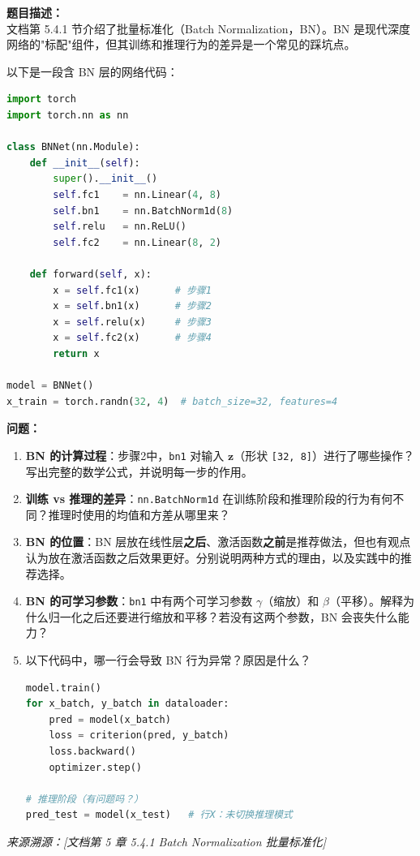 \documentclass[a4paper,11pt]{ctexart}
\begin{document}
\begin{problembox}
    \textbf{题目描述：}\\
    文档第 5.4.1 节介绍了批量标准化（Batch Normalization，BN）。BN 是现代深度网络的"标配"组件，但其训练和推理行为的差异是一个常见的踩坑点。

    \vspace{0.3cm}
    以下是一段含 BN 层的网络代码：
    \begin{lstlisting}[language=Python]
import torch
import torch.nn as nn

class BNNet(nn.Module):
    def __init__(self):
        super().__init__()
        self.fc1    = nn.Linear(4, 8)
        self.bn1    = nn.BatchNorm1d(8)
        self.relu   = nn.ReLU()
        self.fc2    = nn.Linear(8, 2)

    def forward(self, x):
        x = self.fc1(x)      # 步骤1
        x = self.bn1(x)      # 步骤2
        x = self.relu(x)     # 步骤3
        x = self.fc2(x)      # 步骤4
        return x

model = BNNet()
x_train = torch.randn(32, 4)  # batch_size=32, features=4
    \end{lstlisting}

    \textbf{问题：}
    \begin{enumerate}[(1)]
        \item \textbf{BN 的计算过程}：步骤2中，\texttt{bn1} 对输入 $\mathbf{z}$（形状 \texttt{[32, 8]}）进行了哪些操作？写出完整的数学公式，并说明每一步的作用。

        \item \textbf{训练 vs 推理的差异}：\texttt{nn.BatchNorm1d} 在训练阶段和推理阶段的行为有何不同？推理时使用的均值和方差从哪里来？

        \item \textbf{BN 的位置}：BN 层放在线性层\textbf{之后}、激活函数\textbf{之前}是推荐做法，但也有观点认为放在激活函数之后效果更好。分别说明两种方式的理由，以及实践中的推荐选择。

        \item \textbf{BN 的可学习参数}：\texttt{bn1} 中有两个可学习参数 $\gamma$（缩放）和 $\beta$（平移）。解释为什么归一化之后还要进行缩放和平移？若没有这两个参数，BN 会丧失什么能力？

        \item 以下代码中，哪一行会导致 BN 行为异常？原因是什么？
        \begin{lstlisting}[language=Python]
model.train()
for x_batch, y_batch in dataloader:
    pred = model(x_batch)
    loss = criterion(pred, y_batch)
    loss.backward()
    optimizer.step()

# 推理阶段（有问题吗？）
pred_test = model(x_test)   # 行X：未切换推理模式
        \end{lstlisting}
    \end{enumerate}

    \vspace{0.2cm}
    {\color{gray}\small\textit{来源溯源：[文档第 5 章 5.4.1 Batch Normalization 批量标准化]}}
\end{problembox}
\end{document}
